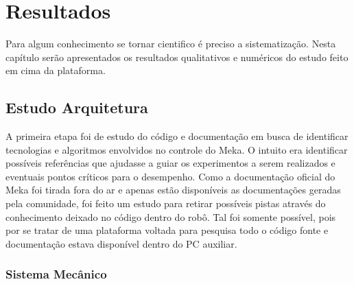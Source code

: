 \chapter{Resultados\label{ch:results}}






Para algum conhecimento se tornar cientifico é preciso a sistematização. Nesta capítulo serão apresentados os resultados qualitativos e numéricos do estudo feito em cima da plataforma.

\section{Estudo Arquitetura}

A primeira etapa foi de estudo do código e documentação em busca de identificar tecnologias e algoritmos envolvidos no controle do Meka. O intuito era identificar possíveis referências que ajudasse a guiar os experimentos a serem realizados e eventuais pontos críticos para o desempenho. Como a documentação oficial do Meka foi tirada fora do ar e apenas estão disponíveis as documentações geradas pela comunidade, foi feito um estudo para retirar possíveis pistas através do conhecimento deixado no código dentro do robô. Tal foi somente possível, pois por se tratar de uma plataforma voltada para pesquisa todo o código fonte e documentação estava disponível dentro do PC auxiliar.

\subsection{Sistema Mecânico}


